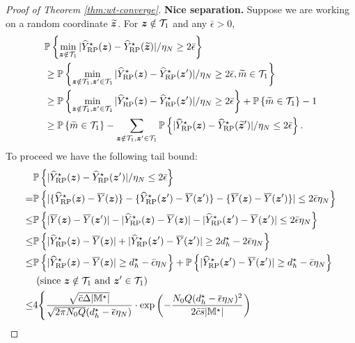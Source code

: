 \documentclass[12pt]{article}
\begin{document}
\begin{proof}[Proof of Theorem \ref{thm:wt-converge}]
\textbf{Nice separation.} Suppose we are working on a random coordinate $\widetilde{{\boldsymbol{z}}}$. For ${\boldsymbol{z}}\notin {\mathcal{T}}_{1}$ and any $\bar{\epsilon}>0$, 
\begin{align}
    &{\mathbb{P}}\left\{\min_{{\boldsymbol{z}}\notin {\mathcal{T}}_{1}}|{\widehat{Y}}^\star_{\operatorname{RP}}({\boldsymbol{z}}) - {\widehat{Y}}^\star_{\operatorname{RP}}(\widetilde{{\boldsymbol{z}}})|/\eta_N \ge 2\bar{\epsilon}\right\} \notag\\
    & \ge {\mathbb{P}}\left\{\min_{{\boldsymbol{z}}\notin {\mathcal{T}}_{1}, {\boldsymbol{z}}'\in {\mathcal{T}}_{1}}|{\widehat{Y}}^\star_{\operatorname{RP}}({\boldsymbol{z}}) - {\widehat{Y}}^\star_{\operatorname{RP}}({{\boldsymbol{z}}}')|/\eta_N \ge 2\bar{\epsilon}, \widetilde{m}\in {\mathcal{T}}_{1}\right\}\notag\\
    & \ge {\mathbb{P}}\left\{\min_{{\boldsymbol{z}}\notin {\mathcal{T}}_{1}, {\boldsymbol{z}}'\in {\mathcal{T}}_{1}}|{\widehat{Y}}^\star_{\operatorname{RP}}({\boldsymbol{z}}) - {\widehat{Y}}^\star_{\operatorname{RP}}({{\boldsymbol{z}}}')|/\eta_N \ge 2\bar{\epsilon}\right\} + {\mathbb{P}}\left\{\widetilde{m}\in {\mathcal{T}}_{1}\right\} - 1\notag\\
    & \ge {\mathbb{P}}\left\{\widetilde{m}\in {\mathcal{T}}_{1}\right\} - \sum_{{\boldsymbol{z}}\notin {\mathcal{T}}_{1}, {\boldsymbol{z}}'\in{\mathcal{T}}_{1}}{\mathbb{P}}\left\{|{\widehat{Y}}^\star_{\operatorname{RP}}({\boldsymbol{z}}) - {\widehat{Y}}^\star_{\operatorname{RP}}(\widetilde{{\boldsymbol{z}}}')|/\eta_N \le 2\bar{\epsilon}\right\}. \label{eqn:separation-1}
\end{align}
To proceed we have the following tail bound:
\begin{align*}
    & \bbP\lt\{|\hY^\star_{\operatorname{RP}}(\bz) - \hY^\star_{\operatorname{RP}}(\bz')|/\eta_N \le 2\bar{\epsilon}\rt\} \\
    = & \bbP\lt\{|\{\hY^\star_{\operatorname{RP}}(\bz)-\overline{Y}(\bz)\} - \{\hY^\star_{\operatorname{RP}}(\bz')-\overline{Y}(\bz')\} - \{\overline{Y}(\bz)-\overline{Y}(\bz')\}| \le 2\bar{\epsilon}\eta_N\rt\}\\
    \le &  \bbP\lt\{|\overline{Y}(\bz)-\overline{Y}(\bz')|-|\hY^\star_{\operatorname{RP}}(\bz)-\overline{Y}(\bz)| - |\hY^\star_{\operatorname{RP}}(\bz')-\overline{Y}(\bz')| \le 2\bar{\epsilon}\eta_N\rt\}\\
    \le & \bbP\lt\{|\hY^\star_{\operatorname{RP}}(\bz)-\overline{Y}(\bz)| + |\hY^\star_{\operatorname{RP}}(\bz')-\overline{Y}(\bz')|\ge 2d_h^\star - 2\bar{\epsilon}\eta_N \rt\}\\
    \le & \bbP\lt\{|\hY^\star_{\operatorname{RP}}(\bz)-\overline{Y}(\bz)|\ge  {d_h^\star - \bar{\epsilon}\eta_N} \rt\} + \bbP\lt\{|\hY^\star_{\operatorname{RP}}(\bz')-\overline{Y}(\bz')|\ge {d_h^\star - \bar{\epsilon}\eta_N} \rt\} \\
    & \see{since $\bz\notin\cT_{1}$ and $\bz'\in\cT_{1}$}\\
    \le & 4\Bigg\{ \frac{\sqrt{\bar{c}\Delta|\bbM^\star|}}{\sqrt{2\pi N_0Q }(d_h^\star - \overline{\epsilon}\eta_N)}\cdot \exp\lt(-\frac{ N_0Q (d_h^\star - \overline{\epsilon}\eta_N)^2}{2\bar{c}\bar{s}|\bbM^\star|}\rt) \\

\end{align*}
\end{proof}
\end{document}
